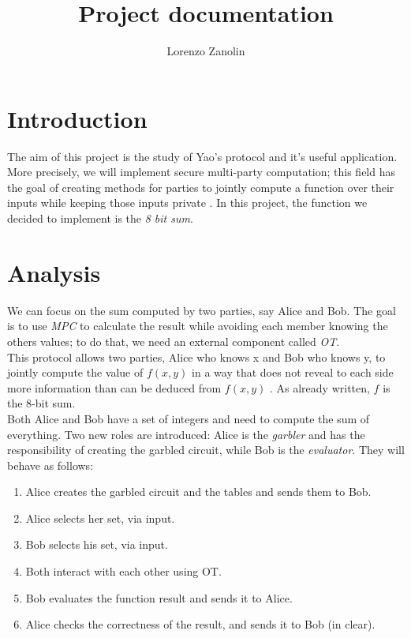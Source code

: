 \documentclass[12pt]{article}
\title{Project documentation}
\author{Lorenzo Zanolin}
\begin{document}
\maketitle

\section{Introduction}
The aim of this project is the study of Yao's protocol \cite{yao} and it's useful application. More precisely, we will implement secure multi-party computation; this field has the goal of creating methods for parties to jointly compute a function over their inputs while keeping those inputs private \cite{mpc}. In this project, the function we decided to implement is the \textit{8 bit sum}.

\section{Analysis}
We can focus on the sum computed by two parties, say Alice and Bob. The goal is to use \textit{MPC} to calculate the result while avoiding each member knowing the others values; to do that, we need an external component called \textit{OT}.\\ This protocol allows two parties, Alice who
knows x and Bob who knows y, to jointly compute the value of $f(x, y)$ in a way that does not reveal to each side more information than can be deduced from $f(x, y)$ \cite{ot}. As already written, $f$ is the 8-bit sum.\\ Both Alice and Bob have a set of integers and need to compute the sum of everything.
Two new roles are introduced: Alice is the \textit{garbler} and has the responsibility of creating the garbled circuit, while Bob is the \textit{evaluator}.
They will behave as follows:
\begin{enumerate}\label{behaviour}
    \item Alice creates the garbled circuit and the tables and sends them to Bob.
    \item Alice selects her set, via input.
    \item Bob selects his set, via input.
    \item Both interact with each other using OT.
    \item Bob evaluates the function result and sends it to Alice.
    \item Alice checks the correctness of the result, and sends it to Bob (in clear).
\end{enumerate}
\end{document}
